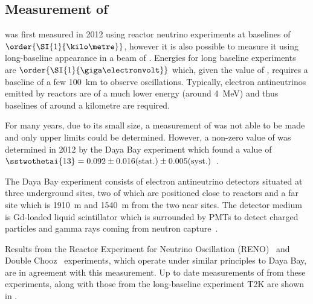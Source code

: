 \subsection{Measurement of }
\label{sec:theory:currentState:theta13}

 was first measured in 2012 using reactor neutrino experiments at baselines of $\order{\SI{1}{\kilo\metre}}$, however it is also possible to measure it using long-baseline \nue appearance in a beam of \numu.
Energies for long baseline experiments are $\order{\SI{1}{\giga\electronvolt}}$ which, given the value of , requires a baseline of a few \SI{100}{\kilo\metre} to observe oscillations.
Typically, electron antineutrinos emitted by reactors are of a much lower energy (around \SI{4}{\mega\electronvolt}) and thus baselines of around a kilometre are required.

For many years, due to its small size, a measurement of  was not able to be made and only upper limits could be determined.
However, a non-zero value of  was determined in 2012 by the Daya Bay experiment which found a value of $\sstwothetai{13} = 0.092\pm0.016(\text{stat.})\pm0.005(\text{syst.})$~\cite{dayaBay}.

The Daya Bay experiment consists of electron antineutrino detectors situated at three underground sites, two of which are positioned close to reactors and a far site which is \SI{1910}{\metre} and \SI{1540}{\metre} from the two near sites.
The detector medium is Gd-loaded liquid scintillator which is surrounded by PMTs to detect charged particles and gamma rays coming from neutron capture~\cite{dayaBayDetector}.

Results from the Reactor Experiment for Neutrino Oscillation (RENO)~\cite{reno} and Double Chooz~\cite{doubleChooz} experiments, which operate under similar principles to Daya Bay, are in agreement with this measurement.
Up to date measurements of  from these experiments, along with those from the long-baseline experiment T2K are shown in .

